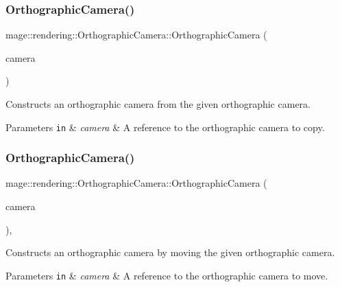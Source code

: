 \subsubsection{\texorpdfstring{Orthographic\+Camera()}{OrthographicCamera()}\hspace{0.1cm}{\footnotesize\ttfamily [2/3]}}
{\footnotesize\ttfamily mage\+::rendering\+::\+Orthographic\+Camera\+::\+Orthographic\+Camera (\begin{DoxyParamCaption}\item[{const \hyperlink{classmage_1_1rendering_1_1_orthographic_camera}{Orthographic\+Camera} \&}]{camera }\end{DoxyParamCaption})\hspace{0.3cm}{\ttfamily [delete]}}

Constructs an orthographic camera from the given orthographic camera.


\begin{DoxyParams}[1]{Parameters}
\mbox{\tt in}  & {\em camera} & A reference to the orthographic camera to copy. \\
\hline
\end{DoxyParams}
\hypertarget{classmage_1_1rendering_1_1_orthographic_camera_a5b2c7d870e2077807057246abf3b76b1}{}\label{classmage_1_1rendering_1_1_orthographic_camera_a5b2c7d870e2077807057246abf3b76b1} 
\subsubsection{\texorpdfstring{Orthographic\+Camera()}{OrthographicCamera()}\hspace{0.1cm}{\footnotesize\ttfamily [3/3]}}
{\footnotesize\ttfamily mage\+::rendering\+::\+Orthographic\+Camera\+::\+Orthographic\+Camera (\begin{DoxyParamCaption}\item[{\hyperlink{classmage_1_1rendering_1_1_orthographic_camera}{Orthographic\+Camera} \&\&}]{camera }\end{DoxyParamCaption})\hspace{0.3cm}{\ttfamily [default]}, {\ttfamily [noexcept]}}

Constructs an orthographic camera by moving the given orthographic camera.


\begin{DoxyParams}[1]{Parameters}
\mbox{\tt in}  & {\em camera} & A reference to the orthographic camera to move. \\
\hline
\end{DoxyParams}
\hypertarget{classmage_1_1rendering_1_1_orthographic_camera_a469e4af1c85a332b8feded9f577a05f6}{}\label{classmage_1_1rendering_1_1_orthographic_camera_a469e4af1c85a332b8feded9f577a05f6} 
